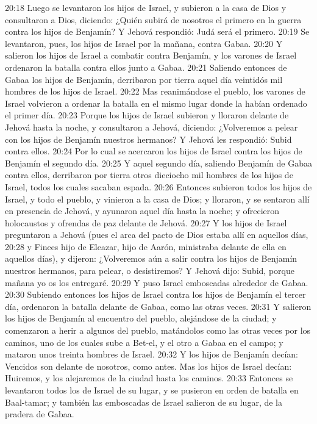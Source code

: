 20:18 Luego se levantaron los hijos de Israel, y subieron a la casa de Dios y consultaron a Dios, diciendo: ¿Quién subirá de nosotros el primero en la guerra contra los hijos de Benjamín? Y Jehová respondió: Judá será el primero.  
20:19 Se levantaron, pues, los hijos de Israel por la mañana, contra Gabaa.  
20:20 Y salieron los hijos de Israel a combatir contra Benjamín, y los varones de Israel ordenaron la batalla contra ellos junto a Gabaa.  
20:21 Saliendo entonces de Gabaa los hijos de Benjamín, derribaron por tierra aquel día veintidós mil hombres de los hijos de Israel.  
20:22 Mas reanimándose el pueblo, los varones de Israel volvieron a ordenar la batalla en el mismo lugar donde la habían ordenado el primer día.  
20:23 Porque los hijos de Israel subieron y lloraron delante de Jehová hasta la noche, y consultaron a Jehová, diciendo: ¿Volveremos a pelear con los hijos de Benjamín nuestros hermanos? Y Jehová les respondió: Subid contra ellos.  
20:24 Por lo cual se acercaron los hijos de Israel contra los hijos de Benjamín el segundo día.  
20:25 Y aquel segundo día, saliendo Benjamín de Gabaa contra ellos, derribaron por tierra otros dieciocho mil hombres de los hijos de Israel, todos los cuales sacaban espada.  
20:26 Entonces subieron todos los hijos de Israel, y todo el pueblo, y vinieron a la casa de Dios; y lloraron, y se sentaron allí en presencia de Jehová, y ayunaron aquel día hasta la noche; y ofrecieron holocaustos y ofrendas de paz delante de Jehová.  
20:27 Y los hijos de Israel preguntaron a Jehová (pues el arca del pacto de Dios estaba allí en aquellos días,  
20:28 y Finees hijo de Eleazar, hijo de Aarón, ministraba delante de ella en aquellos días), y dijeron: ¿Volveremos aún a salir contra los hijos de Benjamín nuestros hermanos, para pelear, o desistiremos? Y Jehová dijo: Subid, porque mañana yo os los entregaré.  
20:29 Y puso Israel emboscadas alrededor de Gabaa.  
20:30 Subiendo entonces los hijos de Israel contra los hijos de Benjamín el tercer día, ordenaron la batalla delante de Gabaa, como las otras veces.  
20:31 Y salieron los hijos de Benjamín al encuentro del pueblo, alejándose de la ciudad; y comenzaron a herir a algunos del pueblo, matándolos como las otras veces por los caminos, uno de los cuales sube a Bet-el, y el otro a Gabaa en el campo; y mataron unos treinta hombres de Israel.  
20:32 Y los hijos de Benjamín decían: Vencidos son delante de nosotros, como antes. Mas los hijos de Israel decían: Huiremos, y los alejaremos de la ciudad hasta los caminos.  
20:33 Entonces se levantaron todos los de Israel de su lugar, y se pusieron en orden de batalla en Baal-tamar; y también las emboscadas de Israel salieron de su lugar, de la pradera de Gabaa.  
